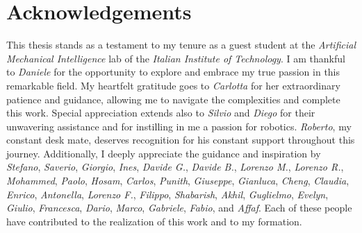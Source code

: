 \documentclass{Configuration_Files/PoliMi3i_thesis}
\begin{document}
\listoffigures

\listoftables


\chapter*{Acknowledgements}

This thesis stands as a testament to my tenure as a guest student at the \textit{Artificial Mechanical Intelligence} lab of the \textit{Italian Institute of Technology}. I am thankful to \textit{Daniele} for the opportunity to explore and embrace my true passion in this remarkable field. My heartfelt gratitude goes to \textit{Carlotta} for her extraordinary patience and guidance, allowing me to navigate the complexities and complete this work. Special appreciation extends also to \textit{Silvio} and \textit{Diego} for their unwavering assistance and for instilling in me a passion for robotics. \textit{Roberto}, my constant desk mate, deserves recognition for his constant support throughout this journey. Additionally, I deeply appreciate the guidance and inspiration by \textit{Stefano}, \textit{Saverio}, \textit{Giorgio}, \textit{Ines}, \textit{Davide G.}, \textit{Davide B.}, \textit{Lorenzo M.}, \textit{Lorenzo R.}, \textit{Mohammed}, \textit{Paolo}, \textit{Hosam}, \textit{Carlos}, \textit{Punith}, \textit{Giuseppe}, \textit{Gianluca}, \textit{Cheng}, \textit{Claudia}, \textit{Enrico}, \textit{Antonella}, \textit{Lorenzo F.}, \textit{Filippo}, \textit{Shabarish}, \textit{Akhil}, \textit{Guglielmo}, \textit{Evelyn}, \textit{Giulio}, \textit{Francesca}, \textit{Dario}, \textit{Marco}, \textit{Gabriele}, \textit{Fabio}, and \textit{Affaf}. Each of these people have contributed to the realization of this work and to my formation.
\end{document}
